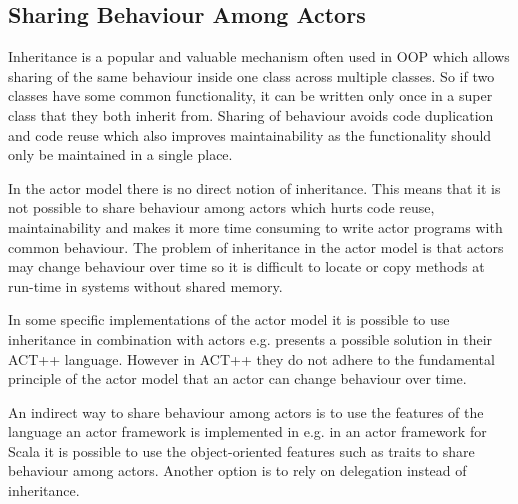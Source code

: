 \subsection{Sharing Behaviour Among Actors}\label{ssec:share_behaviour}
Inheritance is a popular and valuable mechanism often used in \ac{OOP} which allows sharing of the same behaviour inside one class across multiple classes\cite{kafura1989inheritance}. So if two classes have some common functionality, it can be written only once in a super class that they both inherit from. Sharing of behaviour avoids code duplication and code reuse which also improves maintainability as the functionality should only be maintained in a single place.

In the actor model there is no direct notion of inheritance\cite{mackay1997has}. This means that it is not possible to share behaviour among actors which hurts code reuse, maintainability and makes it more time consuming to write actor programs with common behaviour. The problem of inheritance in the actor model is that actors may change behaviour over time so it is difficult to locate or copy methods at run-time in systems without shared memory\cite{kafura1989inheritance}.

In some specific implementations of the actor model it is possible to use inheritance in combination with actors e.g. \cite{kafura1989inheritance} presents a possible solution in their ACT++ language. However in ACT++ they do not adhere to the fundamental principle of the actor model that an actor can change behaviour over time. 

An indirect way to share behaviour among actors is to use the features of the language an actor framework is implemented in e.g. in an actor framework for Scala it is possible to use the object-oriented features such as traits to share behaviour among actors. Another option is to rely on delegation instead of inheritance.

